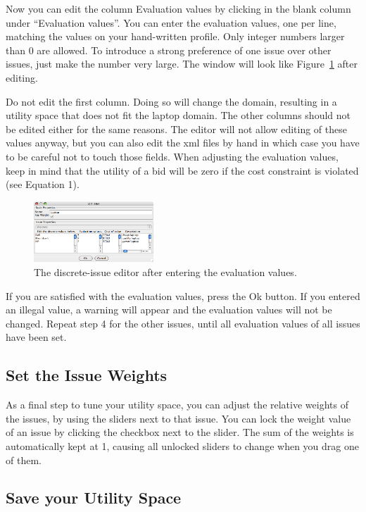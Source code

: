 \documentclass[]{article}
\begin{document}
Now you can edit the column Evaluation values by clicking in the blank column under ``Evaluation values''. You can enter the evaluation values, one per line, matching the values on your hand-written profile. Only integer numbers larger than 0 are allowed. To introduce a strong preference of one issue over other issues, just make the number very large. The window will look like Figure~\ref{Fig:discrete issue editor edited} after editing.

Do not edit the first column. Doing so will change the domain, resulting in a utility space that does not fit the laptop domain. The other columns should not be edited either for the same reasons. The editor will not allow editing of these values anyway, but you can also edit the xml files by hand in which case you have to be careful not to touch those fields.
When adjusting the evaluation values, keep in mind that the utility of a bid will be zero if the cost constraint is violated (see Equation 1).

\begin{figure}[htb]
	\centering
	\includegraphics[width=0.4\textwidth]{media/image10.png}
\caption{The discrete-issue editor after entering the evaluation values.}\label{Fig:discrete issue editor edited}
\end{figure}

If you are satisfied with the evaluation values, press the Ok button. If you entered an illegal value, a warning will appear and the evaluation values will not be changed. Repeat step 4 for the other issues, until all evaluation values of all issues have been set.

\subsection{Set the Issue Weights}
As a final step to tune your utility space, you can adjust the relative weights of the issues, by using the sliders next to that issue. You can lock the weight value of an issue by clicking the checkbox next to the slider. The sum of the weights is automatically kept at 1, causing all unlocked sliders to change when you drag one of them.

\subsection{Save your Utility Space}
\end{document}
